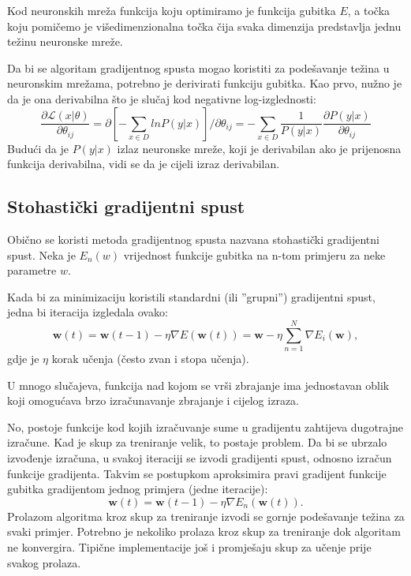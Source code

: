\documentclass[times, utf8, diplomski, numeric]{fer}
\begin{document}
Kod neuronskih mreža funkcija koju optimiramo je funkcija gubitka $E$, a točka koju pomičemo je višedimenzionalna točka čija svaka dimenzija predstavlja jednu težinu neuronske mreže.

Da bi se algoritam gradijentnog spusta mogao koristiti za podešavanje težina u neuronskim mrežama, potrebno je derivirati funkciju gubitka. Kao prvo, nužno je da je ona derivabilna što je slučaj kod negativne log-izglednosti:
\begin{equation}
  \frac{\partial \mathcal{L}(x | \theta)}{\partial \theta_{ij}}
  	= \partial \left[ - \sum_{x \in D} ln P (y|x) \right] / \partial \theta_{ij}
    = - \sum_{x \in D} \frac{1}{P(y|x)} \frac{\partial P(y|x)}{\partial \theta_{ij}}
\end{equation}
Budući da je $P(y|x)$ izlaz neuronske mreže, koji je derivabilan ako je prijenosna funkcija derivabilna, vidi se da je cijeli izraz derivabilan.

\subsection{Stohastički gradijentni spust}

Obično se koristi metoda gradijentnog spusta nazvana stohastički gradijentni spust. Neka je $E_n(w)$ vrijednost funkcije gubitka na n-tom primjeru za neke parametre $w$.

Kada bi za minimizaciju koristili standardni (ili ''grupni'') gradijentni spust, jedna bi iteracija izgledala ovako:
\begin{equation}
    \boldsymbol{w}(t) = \boldsymbol{w}(t-1) - \eta \nabla E(\boldsymbol{w}(t)) = \boldsymbol{w} - \eta \sum_{n=1}^N \nabla E_i(\boldsymbol{w}),
\end{equation}
gdje je $\eta$ korak učenja (često zvan i stopa učenja).

U mnogo slučajeva, funkcija nad kojom se vrši zbrajanje ima jednostavan oblik koji omogućava brzo izračunavanje zbrajanje i cijelog izraza.

No, postoje funkcije kod kojih izračuvanje sume u gradijentu zahtijeva dugotrajne izračune. Kad je skup za treniranje velik, to postaje problem. Da bi se ubrzalo izvođenje izračuna, u svakoj iteraciji se izvodi gradijenti spust, odnosno izračun funkcije gradijenta. Takvim se postupkom aproksimira pravi gradijent funkcije gubitka gradijentom jednog primjera (jedne iteracije):
\begin{equation}
    \boldsymbol{w}(t) = \boldsymbol{w}(t-1) - \eta \nabla E_n(\boldsymbol{w}(t)).
\end{equation}
Prolazom algoritma kroz skup za treniranje izvodi se gornje podešavanje težina za svaki primjer. Potrebno je nekoliko prolaza kroz skup za treniranje dok algoritam ne konvergira. Tipične implementacije još i promješaju skup za učenje prije svakog prolaza.
\end{document}
